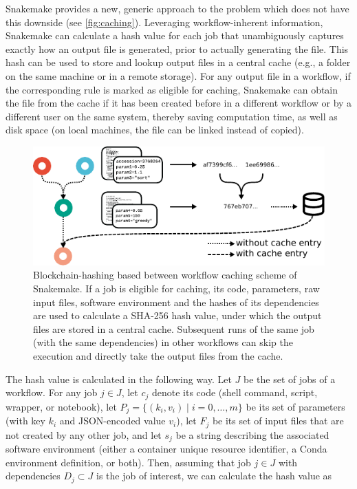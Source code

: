 \documentclass[10pt,a4paper,twocolumn]{article}
\begin{document}
Snakemake provides a new, generic approach to the problem which does not have this downside (see \autoref{fig:caching}).
Leveraging workflow-inherent information, Snakemake can calculate a hash value for each job that unambiguously captures exactly how an output file is generated, prior to actually generating the file.
This hash can be used to store and lookup output files in a central cache (e.g., a folder on the same machine or in a remote storage).
For any output file in a workflow, if the corresponding rule is marked as eligible for caching, Snakemake can obtain the file from the cache if it has been created before in a different workflow or by a different user on the same system, thereby saving computation time, as well as disk space (on local machines, the file can be linked instead of copied).

\begin{figure}
	\centering
	\includegraphics[width=\columnwidth]{caching.pdf}
	\caption{
		Blockchain-hashing based between workflow caching scheme of Snakemake.
		If a job is eligible for caching, its code, parameters, raw input files, software environment and the hashes of its dependencies are used to calculate a SHA-256 hash value, under which the output files are stored in a central cache.
		Subsequent runs of the same job (with the same dependencies) in other workflows can skip the execution and directly take the output files from the cache.
	}
	\label{fig:caching}
\end{figure}

The hash value is calculated in the following way.
Let $J$ be the set of jobs of a workflow.
For any job $j \in J$, let $c_j$ denote its code (shell command, script, wrapper, or notebook), let $P_j = \{(k_i, v_i) \mid i=0,\dots,m\}$ be its set of parameters (with key $k_i$ and JSON-encoded value $v_i$), let $F_j$ be its set of input files that are not created by any other job, and let $s_j$ be a string describing the associated software environment (either a container unique resource identifier, a Conda environment definition, or both).
Then, assuming that job $j \in J$ with dependencies $D_j \subset J$ is the job of interest, we can calculate the hash value as 
\end{document}
